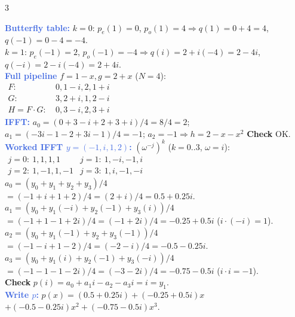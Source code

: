 \documentclass[9pt]{extarticle}
\newcommand{\hl}[1]{\textbf{\textcolor{BrickRed}{#1}}}
\newcommand{\wk}[1]{\textbf{\textcolor{OliveGreen}{#1}}}
\newcommand{\ex}[1]{\textbf{\textcolor{RoyalBlue}{#1}}}
\begin{document}
\begin{multicols}{3}
\begin{sloppypar}
\ex{Butterfly table:} $k{=}0$: $p_e(1){=}0$, $p_o(1){=}4\Rightarrow q(1){=}0{+}4{=}4$, $q({-}1){=}0{-}4{=}{-}4$.\\
$k{=}1$: $p_e({-}1){=}2$, $p_o({-}1){=}{-}4\Rightarrow q(i){=}2{+}i({-}4){=}2{-}4i$, $q({-}i){=}2{-}i({-}4){=}2{+}4i$.\\
\ex{Full pipeline} $f{=}1{-}x,g{=}2{+}x$ ($N{=}4$):\\
$\begin{array}{rcl}
F{:}\ &0,1{-}i,2,1{+}i\\
G{:}\ &3,2{+}i,1,2{-}i\\
H{=}F{\cdot}G{:}\ &0,3{-}i,2,3{+}i
\end{array}$\\
\ex{IFFT:} $a_0{=}(0{+}3{-}i{+}2{+}3{+}i)/4{=}8/4{=}2$; $a_1{=}({-}3i{-}1{-}2{+}3i{-}1)/4{=}{-}1$; $a_2{=}{-}1\Rightarrow$\hl{$h{=}2{-}x{-}x^2$} \wk{Check} OK.\\
\ex{Worked IFFT $y{=}({-}1,i,1,2)$:} $(\omega^{-j})^k$ ($k{=}0..3$, $\omega{=}i$):\\
$\begin{array}{ll}
j{=}0:\ 1,1,1,1 & j{=}1:\ 1,{-}i,{-}1,i\\
j{=}2:\ 1,{-}1,1,{-}1 & j{=}3:\ 1,i,{-}1,{-}i
\end{array}$\\
$a_0{=}(y_0{+}y_1{+}y_2{+}y_3)/4$\\
${=}({-}1{+}i{+}1{+}2)/4{=}(2{+}i)/4{=}0.5{+}0.25i$.\\
$a_1{=}(y_0{+}y_1({-}i){+}y_2({-}1){+}y_3(i))/4$\\
${=}({-}1{+}1{-}1{+}2i)/4{=}({-}1{+}2i)/4{=}{-}0.25{+}0.5i$ ($i{\cdot}({-}i){=}1$).\\
$a_2{=}(y_0{+}y_1({-}1){+}y_2{+}y_3({-}1))/4$\\
${=}({-}1{-}i{+}1{-}2)/4{=}({-}2{-}i)/4{=}{-}0.5{-}0.25i$.\\
$a_3{=}(y_0{+}y_1(i){+}y_2({-}1){+}y_3({-}i))/4$\\
${=}({-}1{-}1{-}1{-}2i)/4{=}({-}3{-}2i)/4{=}{-}0.75{-}0.5i$ ($i{\cdot}i{=}{-}1$).\\
\wk{Check} $p(i){=}a_0{+}a_1i{-}a_2{-}a_3i{=}i{=}y_1$.\\
\ex{Write $p$:} $p(x){=}(0.5{+}0.25i){+}({-}0.25{+}0.5i)x$\\
${+}({-}0.5{-}0.25i)x^2{+}({-}0.75{-}0.5i)x^3$.
\end{sloppypar}


\end{multicols}
\end{document}

